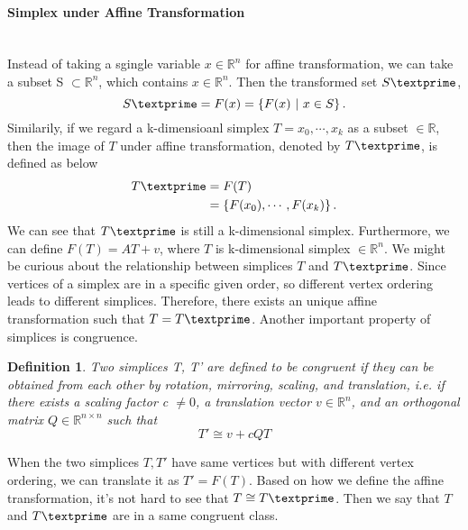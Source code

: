 \documentclass{article}
\newtheorem*{definition*}{Definition}
\begin{document}
    \paragraph{Simplex under Affine Transformation}\mbox{}\\
    Instead of taking a sgingle variable $x\in\mathbb{R}^n$ for affine transformation, we can take a subset S $\subset \mathbb{R}^n$, which contains $x\in\mathbb{R}^n$. Then the transformed set $S\textprime$,
    \begin{equation*}
    S\textprime= {F}(x) = \left\{{F}(x) ~|~ x\in S \right\}.
    \end{equation*}
    Similarily, if we regard a k-dimensioanl simplex ${T} = {x_0, \cdots, x_k}$ as a subset $\in\mathbb{R}$, then the image of ${T}$ under affine transformation, denoted by $T\textprime$, is defined as below
    \begin{equation*}
    \begin{split}
    {T}\textprime & = {F}({T})\\
    & = \left\{{F}(x_0), \cdots , {F}(x_k)\right\}.
    \end{split}
    \end{equation*}
    We can see that ${T}\textprime$ is still a k-dimensional simplex. Furthermore, we can define ${F}({T}) = {AT} + {v}$, where $T$ is k-dimensional simplex $\in\mathbb{R}^n$. We might be curious about the relationship between simplices ${T}$ and ${T}\textprime$. Since vertices of a simplex are in a specific given order, so different vertex ordering leads to different simplices. Therefore, there exists an unique affine transformation such that ${T} = {T}\textprime$. Another important property of simplices is congruence.

    \begin{definition*}
    Two simplices T, T' are defined to be congruent if they can be obtained from each other by rotation, mirroring, scaling, and translation, i.e. if there exists a scaling factor c $\neq 0$, a translation vector $v\in\mathbb{R}^n$, and an orthogonal matrix $Q\in\mathbb{R}^{n\times n}$ such that
    \begin{equation*}
    T' \cong v + cQT
    \end{equation*}
    \end{definition*}
    \noindent
    When the two simplices $T, T'$ have same vertices but with different vertex ordering, we can translate it as $T' = F(T)$. Based on how we define the affine transformation, it's not hard to see that ${T} \cong {T}\textprime$. Then we say that ${T}$ and ${T}\textprime$ are in a same congruent class.
\end{document}
